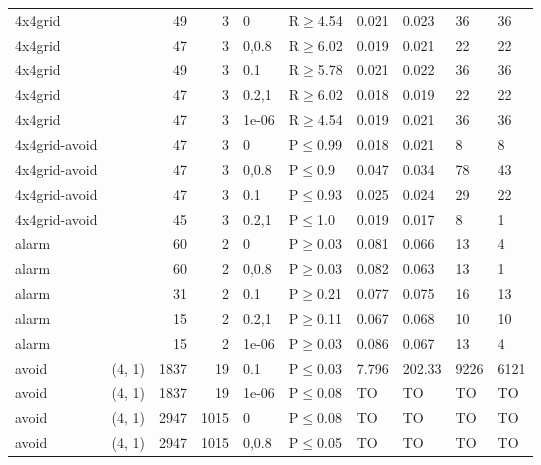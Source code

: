 \begin{longtable}{llrrllllll}
 4x4grid       &           &     	49 &    3 & 0     & R$\geq$4.54  & 0.021   & 0.023   & 36      & 36   \\
 4x4grid       &           &     	47 &    3 & 0,0.8 & R$\geq$6.02  & 0.019   & 0.021   & 22      & 22   \\
 4x4grid       &           &     	49 &    3 & 0.1   & R$\geq$5.78  & 0.021   & 0.022   & 36      & 36   \\
 4x4grid       &           &     	47 &    3 & 0.2,1 & R$\geq$6.02  & 0.018   & 0.019   & 22      & 22   \\
 4x4grid       &           &     	47 &    3 & 1e-06 & R$\geq$4.54  & 0.019   & 0.021   & 36      & 36   \\
 4x4grid-avoid &           &     	47 &    3 & 0     & P$\leq$0.99  & 0.018   & 0.021   & 8       & 8    \\
 4x4grid-avoid &           &     	47 &    3 & 0,0.8 & P$\leq$0.9   & 0.047   & 0.034   & 78      & 43   \\
 4x4grid-avoid &           &     	47 &    3 & 0.1   & P$\leq$0.93  & 0.025   & 0.024   & 29      & 22   \\
 4x4grid-avoid &           &     	45 &    3 & 0.2,1 & P$\leq$1.0   & 0.019   & 0.017   & 8       & 1    \\
 alarm         &           &     	60 &    2 & 0     & P$\geq$0.03  & 0.081   & 0.066   & 13      & 4    \\
 alarm         &           &     	60 &    2 & 0,0.8 & P$\geq$0.03  & 0.082   & 0.063   & 13      & 1    \\
 alarm         &           &     	31 &    2 & 0.1   & P$\geq$0.21  & 0.077   & 0.075   & 16      & 13   \\
 alarm         &           &     	15 &    2 & 0.2,1 & P$\geq$0.11  & 0.067   & 0.068   & 10      & 10   \\
 alarm         &           &     	15 &    2 & 1e-06 & P$\geq$0.03  & 0.086   & 0.067   & 13      & 4    \\
 avoid         & (4, 1)    &   	1837 &   19 & 0.1   & P$\leq$0.03  & 7.796   & 202.33  & 9226    & 6121 \\
 avoid         & (4, 1)    &   	1837 &   19 & 1e-06 & P$\leq$0.08  & TO      & TO      & TO      & TO   \\
 avoid         & (4, 1)    &   	2947 & 1015 & 0     & P$\leq$0.08  & TO      & TO      & TO      & TO   \\
 avoid         & (4, 1)    &   	2947 & 1015 & 0,0.8 & P$\leq$0.05  & TO      & TO      & TO      & TO   \\

\end{longtable}
